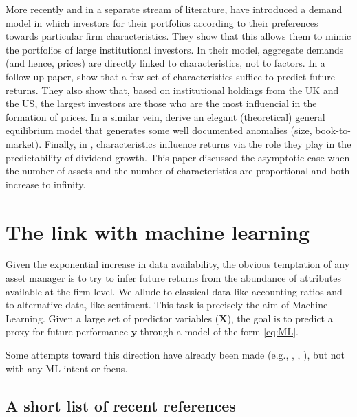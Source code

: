 \documentclass[]{krantz}
\theoremstyle{definition}
\theoremstyle{definition}
\theoremstyle{definition}
\theoremstyle{remark}
\begin{document}
More recently and in a separate stream of literature,
\citet{koijen2019demand} have introduced a demand model in which
investors for their portfolios according to their preferences towards
particular firm characteristics. They show that this allows them to
mimic the portfolios of large institutional investors. In their model,
aggregate demands (and hence, prices) are directly linked to
characteristics, not to factors. In a follow-up paper,
\citet{koijen2019investors} show that a few set of characteristics
suffice to predict future returns. They also show that, based on
institutional holdings from the UK and the US, the largest investors are
those who are the most influencial in the formation of prices. In a
similar vein, \citet{betermier2019supply} derive an elegant
(theoretical) general equilibrium model that generates some well
documented anomalies (size, book-to-market). Finally, in
\citet{martin2019market}, characteristics influence returns via the role
they play in the predictability of dividend growth. This paper discussed
the asymptotic case when the number of assets and the number of
characteristics are proportional and both increase to infinity.

\hypertarget{the-link-with-machine-learning}{%
\section{The link with machine
learning}\label{the-link-with-machine-learning}}

Given the exponential increase in data availability, the obvious
temptation of any asset manager is to try to infer future returns from
the abundance of attributes available at the firm level. We allude to
classical data like accounting ratios and to alternative data, like
sentiment. This task is precisely the aim of Machine Learning. Given a
large set of predictor variables (\(\mathbf{X}\)), the goal is to
predict a proxy for future performance \(\mathbf{y}\) through a model of
the form \eqref{eq:ML}.

Some attempts toward this direction have already been made (e.g.,
\citet{brandt2009parametric}, \citet{ammann2016characteristics},
\citet{martin2018transaction}), but not with any ML intent or focus.

\hypertarget{a-short-list-of-recent-references}{%
\subsection{A short list of recent
references}\label{a-short-list-of-recent-references}}
\end{document}
